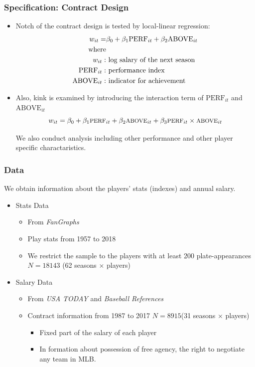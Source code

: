 \documentclass[dvipdfmx,12pt]{beamer}
\begin{document}
\begin{frame}\frametitle{Specification: Contract Design}
  \begin{itemize}
    \small
    \item Notch of the contract design is tested by local-linear regression:
    \begin{align*}
      \footnotesize
      w_{it} = & \beta_0 + \beta_1 \text{PERF}_{it} + \beta_2 \text{ABOVE}_{it} \\
      \text{where} \\
      w_{it}: & \text{ log salary of the next season} \\
      \text{PERF}_{it}: & \text{ performance index} \\
      \text{ABOVE}_{it}: & \text{ indicator for achievement}
    \end{align*}

    \item Also, kink is examined by introducing the interaction term of $\text{PERF}_{it}$ and $\text{ABOVE}_{it}$
    \[
    \footnotesize
    w_{it} = \beta_0 + \beta_1 \text{PERF}_{it} + \beta_2 \text{ABOVE}_{it} + \beta_3 \text{PERF}_{it} \times \text{ABOVE}_{it}
    \]

    We also conduct analysis including other performance and other player specific charactaristics.
  \end{itemize}
\end{frame}

\begin{frame}\frametitle{Data}
  We obtain information about the players' stats (indexes) and annual salary.
  \begin{itemize}
    \item Stats Data
    \begin{itemize}
      \item From \textit{FanGraphs}

      \item Play stats from 1957 to 2018

      \item We restrict the sample to the players with at least 200 plate-appearances $N=18143$ (62 seasons $\times$ players)
    \end{itemize}
    \item Salary Data
    \begin{itemize}
      \item From \textit{USA TODAY} and \textit{Baseball References}

      \item Contract information from 1987 to 2017 $N=8915$(31 seasons $\times$ players)
      \begin{itemize}
        \item Fixed part of the salary of each player

        \item In formation about possession of free agency, the right to negotiate any team in MLB.
      \end{itemize}
    \end{itemize}
  \end{itemize}
\end{frame}
\end{document}
